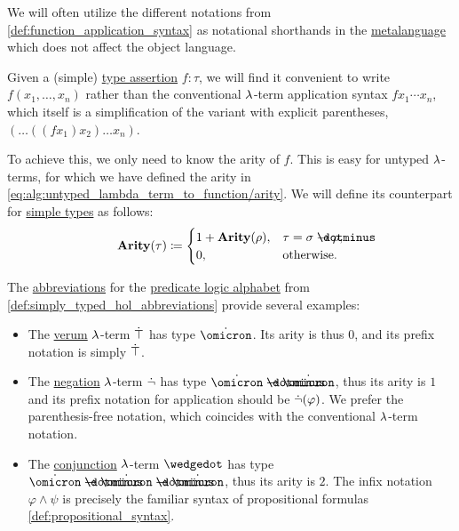 \begin{remark}\label{rem:simple_type_function_syntax}
  We will often utilize the different notations from \cref{def:function_application_syntax} as notational shorthands in the \hyperref[con:metalogic]{metalanguage} which does not affect the object language.

  Given a (simple) \hyperref[con:type_annotation]{type assertion} \( f: \tau \), we will find it convenient to write \( f(x_1, \ldots, x_n) \) rather than the conventional \( {\mathrm \lambda} \)-term application syntax \( f x_1 \cdots x_n \), which itself is a simplification of the variant with explicit parentheses, \( (\ldots ((f x_1) x_2) \ldots x_n) \).

  To achieve this, we only need to know the arity of \( f \). This is easy for untyped \( {\mathrm \lambda} \)-terms, for which we have defined the arity in \eqref{eq:alg:untyped_lambda_term_to_function/arity}. We will define its counterpart for \hyperref[def:simple_type]{simple types} as follows:
  \begin{equation*}
    \op*{Arity}(\tau) \coloneqq \begin{cases}
      1 + \op*{Arity}(\rho), &\tau = \sigma \synimplies \rho, \\
      0,                     &\T{otherwise.}
    \end{cases}
  \end{equation*}

  The \hyperref[con:metalingual_abbreviation]{abbreviations} for the \hyperref[def:predicate_logic_alphabet]{predicate logic alphabet} from \cref{def:simply_typed_hol_abbreviations} provide several examples:
  \begin{itemize}
    \item The \hyperref[def:propositional_alphabet/constants/verum]{verum} \( {\mathrm \lambda} \)-term \( \dot{\top} \) has type \( \syn\omicron \). Its arity is thus \( 0 \), and its prefix notation is simply \( \dot{\top} \).

    \item The \hyperref[def:propositional_alphabet/negation]{negation} \( {\mathrm \lambda} \)-term \( \dot{\neg} \) has type \( \syn\omicron \synimplies \syn\omicron \), thus its arity is \( 1 \) and its prefix notation for application should be \( \dot{\neg}(\varphi) \). We prefer the parenthesis-free notation, which coincides with the conventional \( {\mathrm \lambda} \)-term notation.

    \item The \hyperref[def:propositional_alphabet/connectives/conjunction]{conjunction} \( {\mathrm \lambda} \)-term \( \synwedge \) has type \( \syn\omicron \synimplies \syn\omicron \synimplies \syn\omicron \), thus its arity is \( 2 \). The infix notation \( \varphi \wedge \psi \) is precisely the familiar syntax of propositional formulas \cref{def:propositional_syntax}.


\end{itemize}
\end{remark}
